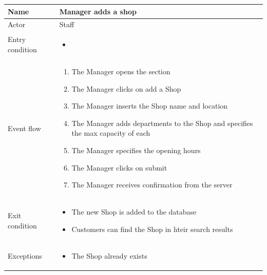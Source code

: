 \begin{table}[H]
    \begin{tabu} to \textwidth {|X|X[4]|}
        \hline
        Name            & Manager adds a shop        \\ \hline
        Actor           & Staff                      \\ \hline
        Entry condition & \begin{itemize}
            \item {}
        \end{itemize} \\ \hline
        Event flow      & \begin{enumerate}
            \item The Manager opens the  section
            \item The Manager clicks on add a Shop
            \item The Manager inserts the Shop name and location
            \item The Manager adds departments to the Shop and specifies the max capacity of each
            \item The Manager specifies the opening hours
            \item The Manager clicks on submit
            \item The Manager receives confirmation from the server
        \end{enumerate} \\ \hline
        Exit condition  & \begin{itemize}
            \item The new Shop is added to the database
            \item Customers can find the Shop in hteir search results
        \end{itemize} \\ \hline
        Exceptions      & \begin{itemize}
            \item The Shop already exists
        \end{itemize} \\ \hline
    \end{tabu}
\end{table}

